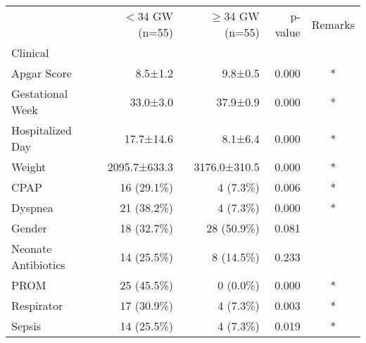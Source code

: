 \begin{tabular}{lrrrc}
\toprule
{} & $<$34 GW (n=55) & $\ge$34 GW (n=55) & p-value & Remarks \\
Clinical            &               &               &         &         \\
\midrule
Apgar Score         &       8.5±1.2 &       9.8±0.5 &   0.000 &       * \\
Gestational Week    &      33.0±3.0 &      37.9±0.9 &   0.000 &       * \\
Hospitalized Day    &     17.7±14.6 &       8.1±6.4 &   0.000 &       * \\
Weight              &  2095.7±633.3 &  3176.0±310.5 &   0.000 &       * \\
CPAP                &    16 (29.1\%) &      4 (7.3\%) &   0.006 &       * \\
Dyspnea             &    21 (38.2\%) &      4 (7.3\%) &   0.000 &       * \\
Gender              &    18 (32.7\%) &    28 (50.9\%) &   0.081 &         \\
Neonate Antibiotics &    14 (25.5\%) &     8 (14.5\%) &   0.233 &         \\
PROM                &    25 (45.5\%) &      0 (0.0\%) &   0.000 &       * \\
Respirator          &    17 (30.9\%) &      4 (7.3\%) &   0.003 &       * \\
Sepsis              &    14 (25.5\%) &      4 (7.3\%) &   0.019 &       * \\
\bottomrule
\end{tabular}

